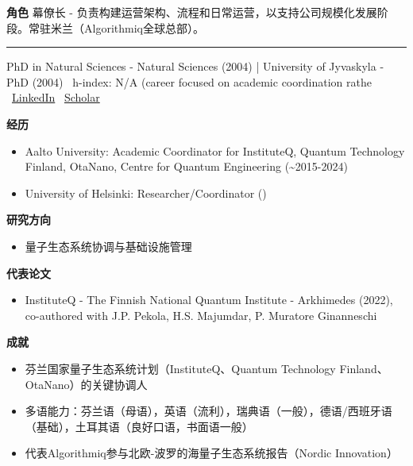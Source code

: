 \par{\footnotesize\color{mainred}\textbf{角色}} {\footnotesize 幕僚长 - 负责构建运营架构、流程和日常运营，以支持公司规模化发展阶段。常驻米兰（Algorithmiq全球总部）。}
\vspace{2pt}\hrule\vspace{2pt}
\vspace{4pt}
\par{\footnotesize\color{graytext}PhD in Natural Sciences - Natural Sciences (2004) | University of Jyvaskyla - PhD (2004) \textbar\  h-index: N/A (career focused on academic coordination rathe \textbar\  \href{https://www.linkedin.com/in/minna-gunes/}{LinkedIn} \textbar\  \href{N/A (limited publication record)}{Scholar}}
\par{\footnotesize\color{mainred}\textbf{经历}}
\begin{itemize}[leftmargin=1.2em,itemsep=0pt,topsep=0pt]
\item {\footnotesize Aalto University: Academic Coordinator for InstituteQ, Quantum Technology Finland, OtaNano, Centre for Quantum Engineering (\textasciitilde{}2015-2024)}
\item {\footnotesize University of Helsinki: Researcher/Coordinator ()}
\end{itemize}
\par{\footnotesize\color{mainred}\textbf{研究方向}}
\begin{itemize}[leftmargin=1.2em,itemsep=0pt,topsep=0pt]
\item {\footnotesize 量子生态系统协调与基础设施管理}
\end{itemize}
\par{\footnotesize\color{mainred}\textbf{代表论文}}
\begin{itemize}[leftmargin=1.2em,itemsep=0pt,topsep=0pt]
\item {\footnotesize InstituteQ - The Finnish National Quantum Institute - Arkhimedes (2022), co-authored with J.P. Pekola, H.S. Majumdar, P. Muratore Ginanneschi}
\end{itemize}
\par{\footnotesize\color{mainred}\textbf{成就}}
\begin{itemize}[leftmargin=1.2em,itemsep=0pt,topsep=0pt]
\item {\footnotesize 芬兰国家量子生态系统计划（InstituteQ、Quantum Technology Finland、OtaNano）的关键协调人}
\item {\footnotesize 多语能力：芬兰语（母语），英语（流利），瑞典语（一般），德语/西班牙语（基础），土耳其语（良好口语，书面语一般）}
\item {\footnotesize 代表Algorithmiq参与北欧-波罗的海量子生态系统报告（Nordic Innovation）}
\end{itemize}
